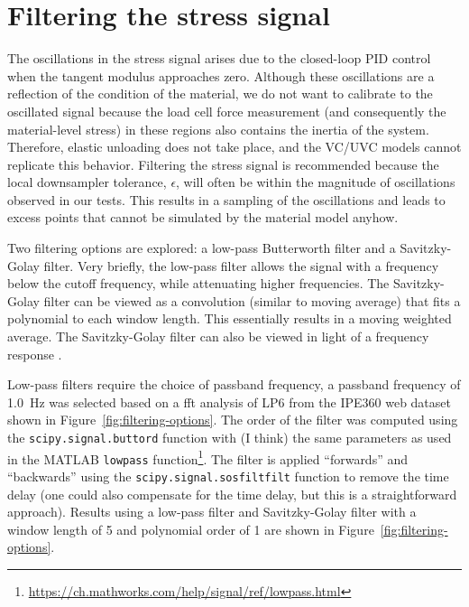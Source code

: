 \documentclass[a4paper,11pt]{article}
\begin{document}



\appendix


\section{Filtering the stress signal}

The oscillations in the stress signal arises due to the closed-loop PID control when the tangent modulus approaches zero.
Although these oscillations are a reflection of the condition of the material, we do not want to calibrate to the oscillated signal because the load cell force measurement (and consequently the material-level stress) in these regions also contains the inertia of the system.
Therefore, elastic unloading does not take place, and the VC/UVC models cannot replicate this behavior.
Filtering the stress signal is recommended because the local downsampler tolerance, $\epsilon$, will often be within the magnitude of oscillations observed in our tests.
This results in a sampling of the oscillations and leads to excess points that cannot be simulated by the material model anyhow.

Two filtering options are explored: a low-pass Butterworth filter and a Savitzky-Golay filter.
Very briefly, the low-pass filter allows the signal with a frequency below the cutoff frequency, while attenuating higher frequencies.
The Savitzky-Golay filter can be viewed as a convolution (similar to moving average) that fits a polynomial to each window length.
This essentially results in a moving weighted average.
The Savitzky-Golay filter can also be viewed in light of a frequency response \citep{SchaferWhatSavitzkyGolayFilter2011}.

Low-pass filters require the choice of passband frequency, a passband frequency of 1.0~Hz was selected based on a fft analysis of LP6 from the IPE360 web dataset shown in Figure~\ref{fig:filtering-options}.
The order of the filter was computed using the \texttt{scipy.signal.buttord} function with (I think) the same parameters as used in the MATLAB \texttt{lowpass} function\footnote{\url{https://ch.mathworks.com/help/signal/ref/lowpass.html}}.
The filter is applied ``forwards'' and ``backwards'' using the \texttt{scipy.signal.sosfiltfilt} function to remove the time delay (one could also compensate for the time delay, but this is a straightforward approach).
Results using a low-pass filter and Savitzky-Golay filter with a window length of 5 and polynomial order of 1 are shown in Figure~\ref{fig:filtering-options}.
\end{document}
